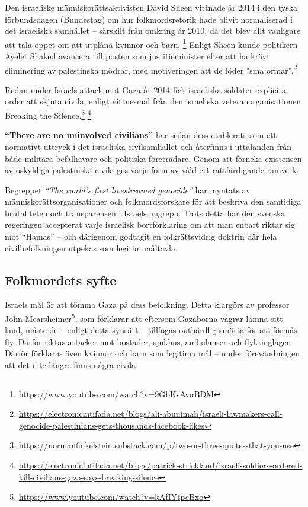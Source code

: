 Den israeliske människorättsaktivisten David Sheen vittnade år 2014 i den tyska förbundsdagen (Bundestag) om hur folkmordsretorik hade blivit normaliserad i det israeliska samhället – särskilt från omkring år 2010, då det blev allt vanligare att tala öppet om att utplåna kvinnor och barn. \footnote{\url{https://www.youtube.com/watch?v=9GbKsAvuBDM}} Enligt Sheen kunde politikern Ayelet Shaked avancera till posten som justitieminister efter att ha krävt eliminering av palestinska mödrar, med motiveringen att de föder "små ormar".\footnote{\url{https://electronicintifada.net/blogs/ali-abunimah/israeli-lawmakers-call-genocide-palestinians-gets-thousands-facebook-likes}}

Redan under Israels attack mot Gaza år 2014 fick israeliska soldater explicita order att skjuta civila, enligt vittnesmål från den israeliska veteranorganisationen Breaking the Silence.\footnote{\url{https://normanfinkelstein.substack.com/p/two-or-three-quotes-that-you-use}} \footnote{\url{https://electronicintifada.net/blogs/patrick-strickland/israeli-soldiers-ordered-kill-civilians-gaza-says-breaking-silence}}

\textbf{“There are no uninvolved civilians”} har sedan dess etablerats som ett normativt uttryck i det israeliska civilsamhället och återfinns i uttalanden från både militära befälhavare och politiska företrädare. Genom att förneka existensen av oskyldiga palestinska civila ges varje form av våld ett rättfärdigande ramverk.

Begreppet \textit{“The world’s first livestreamed genocide”} har myntats av människorättsorganisationer och folkmordsforskare för att beskriva den samtidiga brutaliteten och transparensen i Israels angrepp. Trots detta har den svenska regeringen accepterat varje israelisk bortförklaring om att man enbart riktar sig mot \enquote{Hamas} – och därigenom godtagit en folkrättsvidrig doktrin där hela civilbefolkningen utpekas som legitim måltavla.



\subsection{Folkmordets syfte}

Israels mål är att tömma Gaza på dess befolkning. Detta klargörs av professor John Mearsheimer\footnote{\url{https://www.youtube.com/watch?v=kAfIYtpcBxo}}, som förklarar att eftersom Gazaborna vägrar lämna sitt land, måste de – enligt detta synsätt – tillfogas outhärdlig smärta för att förmås fly. Därför riktas attacker mot bostäder, sjukhus, ambulanser och flyktingläger. Därför förklaras även kvinnor och barn som legitima mål – under förevändningen att det inte längre finns några civila.

